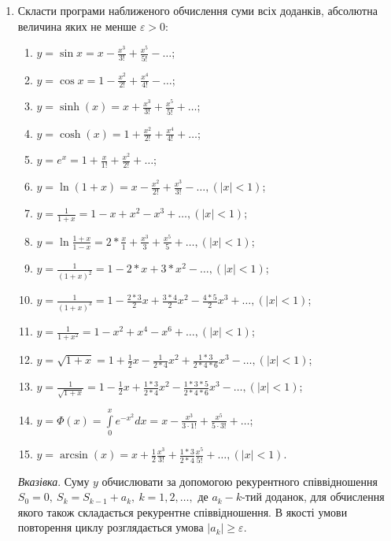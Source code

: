 \documentclass[]{article}
\makeatletter
\newcommand{\xslalph}[1]{\expandafter\@xslalph\csname c@#1\endcsname}
\newcommand{\@xslalph}[1]{%
    \ifcase#1\or а\or б\or в\or г\or д\or e\or є\or ж\or з\or i%
    \or й\or к\or л\or м\or н\or о\or п\or р\or с\or т%
    \or у\or ф\or х\or ц\or ч\or ш\or ю\or я\or аа\or бб\or вв %
    \else\@ctrerr\fi%
}
\makeatother
\begin{document}
\begin{enumerate}
\item
  Скласти програми наближеного обчислення суми всіх доданків, абсолютна
  величина яких не менше $\varepsilon > 0 $:
\begin{enumerate}[label=\xslalph*)]
\item \(y =  \sin x = x - \frac{x^{3}}{3!} + \frac{x^{5}}{5!} - \ldots\);
\item \(y = \cos x = 1 - \frac{x^{2}}{2!} + \frac{x^{4}}{4!} - \ldots\);
\item
\(y =  \sinh (x) = x + \frac{x^{3}}{3!} + \frac{x^{5}}{5!} + \ldots\);
\item 
\(y = \cosh (x) = 1 + \frac{x^{2}}{2!} + \frac{x^{4}}{4!} + \ldots\);
\item \(y = e^{x} = 1 + \frac{x}{1!} + \frac{x^{2}}{2!} + \ldots\);
\item
\(y = \ln(1 + x) = x - \frac{x^{2}}{2!} + \frac{x^{3}}{3!} - \ldots,(\left| x \right| < 1)\);
\item
\(y = \frac{1}{1 + x} = 1 - x + x^{2} - x^{3} + \ldots,(\left| x \right| < 1)\);
\item
\(y = \ln\frac{1 + x}{1 - x} = 2*\frac{x}{1} + \frac{x^{3}}{3} + \frac{x^{5}}{5} + \ldots, (\left| x \right| < 1)\);
\item
\(y = \frac{1}{(1 + x)^{2}} = 1 - 2*x + 3*x^{2} - \ldots,(\left| x \right| < 1)\);
\item
\(y = \frac{1}{(1 + x)^{3}} = 1 - \frac{2*3}{2}x + \frac{3*4}{2}x^{2} - \frac{4*5}{2}x^{3} + \ldots,(\left| x \right| < 1)\);
\item
\(y = \frac{1}{1 + x^{2}} = 1 - x^{2} + x^{4} - x^{6} + \ldots,(\left| x \right| < 1)\);
\item
\(y =   \sqrt{1 + x} = 1 + \frac{1}{2}x - \frac{1}{2*4}x^{2} + \frac{1*3}{2*4*6}x^{3} - \ldots,(\left| x \right| < 1)\);
\item
\(y = \frac{1}{ \sqrt{1 + x}} = 1 - \frac{1}{2}x + \frac{1*3}{2*4}x^{2} - \frac{1*3*5}{2*4*6}x^{3} - \ldots,(\left| x \right| < 1)\);
\item
\(y = \Phi (x) = \int\limits_{0}^{x} e^{-x^{2}} dx = x - \frac{x^{3}}{3 \cdot 1!} + \frac{ x^{5}}{5 \cdot 3!} + \ldots\);
\item
\(y = \arcsin (x) = x + \frac{1}{2}\frac{x^{3}}{3!} + \frac{1*3}{2*4}\frac{x^{5}}{5!} + \ldots,(\left| x \right| < 1)\).

\end{enumerate}

\emph{\emph{Вказівка}}. Суму $y$ обчислювати за допомогою
рекурентного співвідношення
\(S_{0} = 0,\ S_{k} = S_{k - 1} + a_{k},\ k = 1,2,\ldots,\) де
\(a_{k} - k\)-тий доданок, для обчислення якого також складається
рекурентне співвідношення. В якості умови повторення циклу розглядається
умова \(\left| a_{k} \right| \geq \varepsilon.\)


\end{enumerate}
\end{document}

